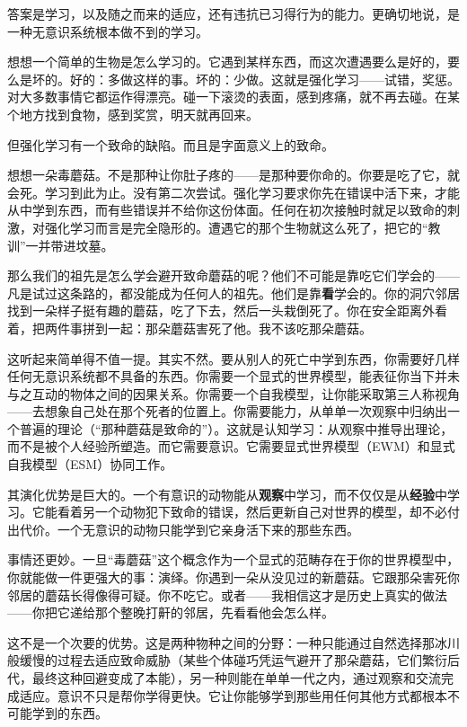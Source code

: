 \documentclass[11pt, twoside, openright]{book}
\begin{document}
答案是学习，以及随之而来的适应，还有违抗已习得行为的能力。更确切地说，是一种无意识系统根本做不到的学习。

想想一个简单的生物是怎么学习的。它遇到某样东西，而这次遭遇要么是好的，要么是坏的。好的：多做这样的事。坏的：少做。这就是强化学习------试错，奖惩。对大多数事情它都运作得漂亮。碰一下滚烫的表面，感到疼痛，就不再去碰。在某个地方找到食物，感到奖赏，明天就再回来。

但强化学习有一个致命的缺陷。而且是字面意义上的致命。

想想一朵毒蘑菇。不是那种让你肚子疼的------是那种要你命的。你要是吃了它，就会死。学习到此为止。没有第二次尝试。强化学习要求你先在错误中活下来，才能从中学到东西，而有些错误并不给你这份体面。任何在初次接触时就足以致命的刺激，对强化学习而言是完全隐形的。遭遇它的那个生物就这么死了，把它的“教训”一并带进坟墓。

那么我们的祖先是怎么学会避开致命蘑菇的呢？他们不可能是靠吃它们学会的------凡是试过这条路的，都没能成为任何人的祖先。他们是靠\textbf{看}学会的。你的洞穴邻居找到一朵样子挺有趣的蘑菇，吃了下去，然后一头栽倒死了。你在安全距离外看着，把两件事拼到一起：那朵蘑菇害死了他。我不该吃那朵蘑菇。

这听起来简单得不值一提。其实不然。要从别人的死亡中学到东西，你需要好几样任何无意识系统都不具备的东西。你需要一个显式的世界模型，能表征你当下并未与之互动的物体之间的因果关系。你需要一个自我模型，让你能采取第三人称视角------去想象自己处在那个死者的位置上。你需要能力，从单单一次观察中归纳出一个普遍的理论（“那种蘑菇是致命的”）。这就是认知学习：从观察中推导出理论，而不是被个人经验所塑造。而它需要意识。它需要显式世界模型（EWM）和显式自我模型（ESM）协同工作。

其演化优势是巨大的。一个有意识的动物能从\textbf{观察}中学习，而不仅仅是从\textbf{经验}中学习。它能看着另一个动物犯下致命的错误，然后更新自己对世界的模型，却不必付出代价。一个无意识的动物只能学到它亲身活下来的那些东西。

事情还更妙。一旦“毒蘑菇”这个概念作为一个显式的范畴存在于你的世界模型中，你就能做一件更强大的事：演绎。你遇到一朵从没见过的新蘑菇。它跟那朵害死你邻居的蘑菇长得像得可疑。你不吃它。或者------我相信这才是历史上真实的做法------你把它递给那个整晚打鼾的邻居，先看看他会怎么样。

这不是一个次要的优势。这是两种物种之间的分野：一种只能通过自然选择那冰川般缓慢的过程去适应致命威胁（某些个体碰巧凭运气避开了那朵蘑菇，它们繁衍后代，最终这种回避变成了本能），另一种则能在单单一代之内，通过观察和交流完成适应。意识不只是帮你学得更快。它让你能够学到那些用任何其他方式都根本不可能学到的东西。
\end{document}

